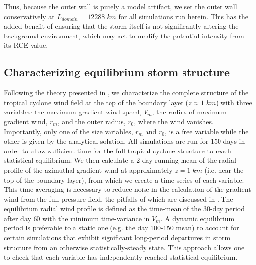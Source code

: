 \documentclass[12pt]{article}
\begin{document}
Thus, because the outer wall is purely a model artifact, we set the outer wall conservatively at $L_{domain} = 12288 \; km$ for all simulations run herein.  This has the added benefit of ensuring that the storm itself is not significantly altering the background environment, which may act to modify the potential intensity from its RCE value.

\subsection{Characterizing equilibrium storm structure}
Following the theory presented in \cite{Emanuel_Rotunno_2011}, we characterize the complete structure of the tropical cyclone wind field at the top of the boundary layer ($z \approx 1 \; km$) with three variables: the maximum gradient wind speed, $V_m$, the radius of maximum gradient wind, $r_m$, and the outer radius, $r_0$, where the wind vanishes. Importantly, only one of the size variables, $r_m$ and $r_0$, is a free variable while the other is given by the analytical solution.  All simulations are run for 150 days in order to allow sufficient time for the full tropical cyclone structure to reach statistical equilibrium. We then calculate a 2-day running mean of the radial profile of the azimuthal gradient wind at approximately $z = 1 \; km$ (i.e. near the top of the boundary layer), from which we create a time-series of each variable. This time averaging is necessary to reduce noise in the calculation of the gradient wind from the full pressure field, the pitfalls of which are discussed in \cite{Bryan_Rotunno_2009}. The equilibrium radial wind profile is defined as the time-mean of the 30-day period after day 60 with the minimum time-variance in $V_m$. A dynamic equilibrium period is preferable to a static one (e.g. the day 100-150 mean) to account for certain simulations that exhibit significant long-period departures in storm structure from an otherwise statistically-steady state. This approach allows one to check that each variable has independently reached statistical equilibrium.

\end{document}

